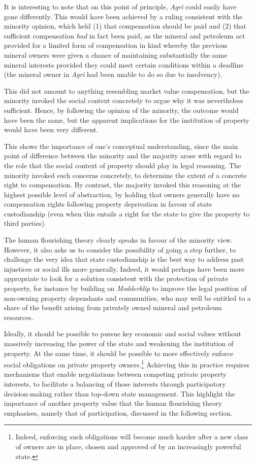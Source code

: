 {It is interesting to note that on this point of principle, {\it Agri} could easily have gone differently. This would have been achieved by a ruling consistent with the minority opinion, which held (1) that compensation should be paid and (2) that sufficient compensation {\it had} in fact been paid, as the mineral and petroleum act provided for a limited form of compensation in kind whereby the previous mineral owners were given a chance of maintaining substantially the same mineral interests provided they could meet certain conditions within a deadline (the mineral owner in {\it Agri} had been unable to do so due to insolvency).

This did not amount to anything resembling market value compensation, but the minority invoked the social context concretely to argue why it was nevertheless sufficient. Hence, by following the opinion of the minority, the outcome would have been the same, but the apparent implications for the institution of property would have been very different.

This shows the importance of one's conceptual understanding, since the main point of difference between the minority and the majority arose with regard to the role that the social context of property should play in legal reasoning. The minority invoked such concerns concretely, to determine the extent of a concrete right to compensation. By contrast, the majority invoked this reasoning at the highest possible level of abstraction, by holding that owners generally have no compensation rights following property deprivation in favour of state custodianship (even when this entails a right for the state to give the property to third parties).

The human flourishing theory clearly speaks in favour of the minority view. However, it also asks us to consider the possibility of going a step further, to challenge the very idea that state custodianship is the best way to address past injustices or social ills more generally. Indeed, it would perhaps have been more appropriate to look for a solution consistent with the protection of private property, for instance by building on {\it Modderklip} to improve the legal position of non-owning property dependants and communities, who may well be entitled to a share of the benefit arising from privately owned mineral and petroleum resources.
}
Ideally, it should be possible to pursue key economic and social values without massively increasing the power of the state and weakening the institution of property. At the same time, it should be possible to more effectively enforce social obligations on private property owners.\footnote{Indeed, enforcing such obligations will become much harder after a new class of owners are in place, chosen and approved of by an increasingly powerful state. } Achieving this in practice requires mechanisms that enable negotiations between competing private property interests, to facilitate a balancing of those interests through participatory decision-making rather than top-down state management. This highlight the importance of another property value that the human flourishing theory emphasises, namely that of participation, discussed in the following section.

